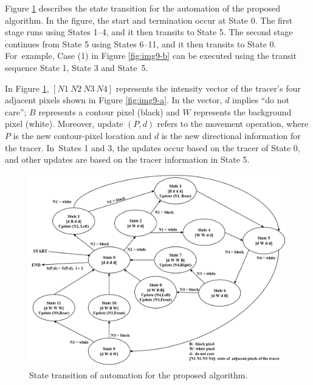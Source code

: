\documentclass[sensors,article,accept,moreauthors,pdftex,10pt,a4paper]{mdpi}
\begin{document}
Figure \ref{fig:image10} describes the state transition for the automation of the proposed algorithm. In the figure, the start and termination occur at State 0. The first stage runs using States 1--4, and it then transits to State 5. The second stage continues from State 5 using States 6--11, and it then transits to State 0. For~example, Case (1) in Figure \ref{fig:img9-b} can be executed using the transit sequence State 1, State 3 and State~5.


\newpage
In Figure \ref{fig:image10}, $[N1\ N2\ N3\ N4]$ represents the intensity vector of the tracer's four adjacent pixels shown in Figure \ref{fig:img9-a}. In the vector, $d$ implies ``do not care''; $B$ represents a contour pixel (black) and $W$ represents the background pixel (white). Moreover, update $(P,d)$ refers to the movement operation, where $P$ is the new contour-pixel location and $d$ is the new directional information for the tracer. In~States 1 and 3, the updates occur based on the tracer of State 0, and other updates are based on the tracer information in State 5.


\begin{figure}[H]
	\centering
	\includegraphics[width=1.0\textwidth]{4.Proposed/state.png}
	\caption{State transition of automation for the proposed algorithm.}
	\label{fig:image10}
\end{figure}
\end{document}
